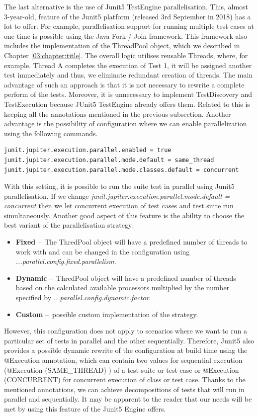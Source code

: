 The last alternative is the use of Junit5 TestEngine parallelisation.
This, almost 3-year-old, feature of the Junit5 platform (released 3rd September in 2018) has a lot to offer.
For example, parallelisation support for running multiple test cases at one time is possible using the Java Fork / Join framework.
This framework also includes the implementation of the ThreadPool object, which we described in Chapter \ref{03:chapter:title}.
The overall logic utilises reusable Threads, where, for example.
Thread A completes the execution of Test 1, it will be assigned another test immediately and thus, we eliminate redundant creation of threads.
The main advantage of such an approach is that it is not necessary to rewrite a complete perform of the tests.
Moreover, it is unnecessary to implement TestDiscovery and TestExecution because JUnit5 TestEngine already offers them.
Related to this is keeping all the annotations mentioned in the previous subsection.
Another advantage is the possibility of configuration where we can enable parallelization using the following commands.
\begin{verbatim}
junit.jupiter.execution.parallel.enabled = true
junit.jupiter.execution.parallel.mode.default = same_thread
junit.jupiter.execution.parallel.mode.classes.default = concurrent
\end{verbatim}
With this setting, it is possible to run the suite test in parallel using Junit5 parallelisation.
If we change \emph{junit.jupiter.execution.parallel.mode.default = concurrent} then we let concurrent execution of test cases and test suite run simultaneously.
Another good aspect of this feature is the ability to choose the best variant of the parallelisation strategy:
\begin{itemize}[itemsep=1mm, parsep=0pt]
    \item \textbf{Fixed} \---\ The ThredPool object will have a predefined number of threads to work with and can be changed in the configuration using \emph{...parallel.config.fixed.parallelism}.
    \item \textbf{Dynamic} \---\ ThredPool object will have a predefined number of threads based on the calculated available processors multiplied by the number specified by \emph {...parallel.config.dynamic.factor}.
    \item \textbf{Custom} \---\ possible custom implementation of the strategy.
\end{itemize}
However, this configuration does not apply to scenarios where we want to run a particular set of tests in parallel and the other sequentially.
Therefore, Junit5 also provides a possible dynamic rewrite of the configuration at build time using the @Execution annotation, which can contain two values for sequential execution (@Execution (SAME\_THREAD) ) of a test suite or test case or @Execution (CONCURRENT) for concurrent execution of class or test case.
Thanks to the mentioned annotations, we can achieve decompositions of tests that will run in parallel and sequentially.
It may be apparent to the reader that our needs will be met by using this feature of the Junit5 Engine offers.

